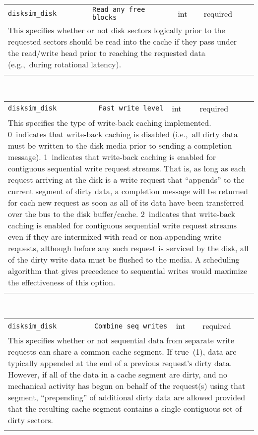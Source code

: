 \noindent 
\begin{tabular}{|p{1.5in}|p{3.5in}|p{0.5in}|p{0.5in}|}
\cline{1-4}
\texttt{disksim\_disk} & \texttt{Read any free blocks} & int & required \\ 
\cline{1-4}
\multicolumn{4}{|p{6in}|}{
This specifies whether or not disk sectors logically prior to the
requested sectors should be read into the cache if they pass under the
read/write head prior to reaching the requested data (e.g.,~during
rotational latency).
}\\ 
\cline{1-4}
\multicolumn{4}{p{5in}}{}\\
\end{tabular}\\ 
\noindent 
\begin{tabular}{|p{1.5in}|p{3.5in}|p{0.5in}|p{0.5in}|}
\cline{1-4}
\texttt{disksim\_disk} & \texttt{Fast write level} & int & required \\ 
\cline{1-4}
\multicolumn{4}{|p{6in}|}{
This specifies the type of write-back caching implemented.
0~indicates that write-back caching is disabled (i.e.,~all dirty data
must be written to the disk media prior to sending a completion
message).
1~indicates that write-back caching is enabled for contiguous
sequential write request streams. That is, as long as each request
arriving at the disk is a write request that ``appends'' to the
current segment of dirty data, a completion message will be returned
for each new request as soon as all of its data have been transferred
over the bus to the disk buffer/cache.
2~indicates that write-back caching is enabled for contiguous
sequential write request streams even if they are intermixed with read
or non-appending write requests, although before any such request is
serviced by the disk, all of the dirty write data must be flushed to
the media. A scheduling algorithm that gives precedence to sequential
writes would maximize the effectiveness of this option.
}\\ 
\cline{1-4}
\multicolumn{4}{p{5in}}{}\\
\end{tabular}\\ 
\noindent 
\begin{tabular}{|p{1.5in}|p{3.5in}|p{0.5in}|p{0.5in}|}
\cline{1-4}
\texttt{disksim\_disk} & \texttt{Combine seq writes} & int & required \\ 
\cline{1-4}
\multicolumn{4}{|p{6in}|}{
This specifies whether or not sequential data from separate write requests
can share a common cache segment. If true~(1), data are typically
appended at the end of a previous request's dirty data. However, if
all of the data in a cache segment are dirty, and no mechanical
activity has begun on behalf of the request(s) using that segment,
``prepending'' of additional dirty data are allowed provided that the
resulting cache segment contains a single contiguous set of dirty
sectors.
}\\ 
\cline{1-4}
\multicolumn{4}{p{5in}}{}\\
\end{tabular}\\ 
